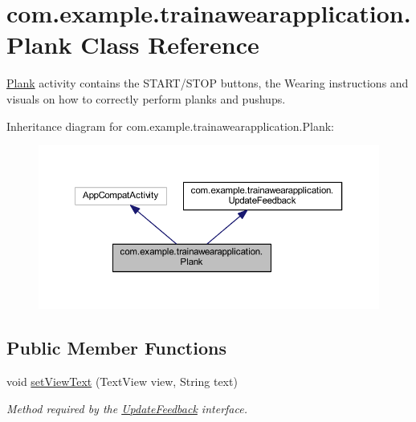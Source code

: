 \hypertarget{classcom_1_1example_1_1trainawearapplication_1_1_plank}{}\section{com.\+example.\+trainawearapplication.\+Plank Class Reference}
\label{classcom_1_1example_1_1trainawearapplication_1_1_plank}


\mbox{\hyperlink{classcom_1_1example_1_1trainawearapplication_1_1_plank}{Plank}} activity contains the S\+T\+A\+R\+T/\+S\+T\+OP buttons, the Wearing instructions and visuals on how to correctly perform planks and pushups.  




Inheritance diagram for com.\+example.\+trainawearapplication.\+Plank\+:
\nopagebreak
\begin{figure}[H]
\begin{center}
\leavevmode
\includegraphics[width=350pt]{classcom_1_1example_1_1trainawearapplication_1_1_plank__inherit__graph}
\end{center}
\end{figure}
\subsection*{Public Member Functions}
\begin{DoxyCompactItemize}
\item 
void \mbox{\hyperlink{classcom_1_1example_1_1trainawearapplication_1_1_plank_a4d4a46b71ced8fe89023ccbf14d17f77}{set\+View\+Text}} (Text\+View view, String text)
\begin{DoxyCompactList}\small\item\em Method required by the \mbox{\hyperlink{interfacecom_1_1example_1_1trainawearapplication_1_1_update_feedback}{Update\+Feedback}} interface. \end{DoxyCompactList}\end{DoxyCompactItemize}
